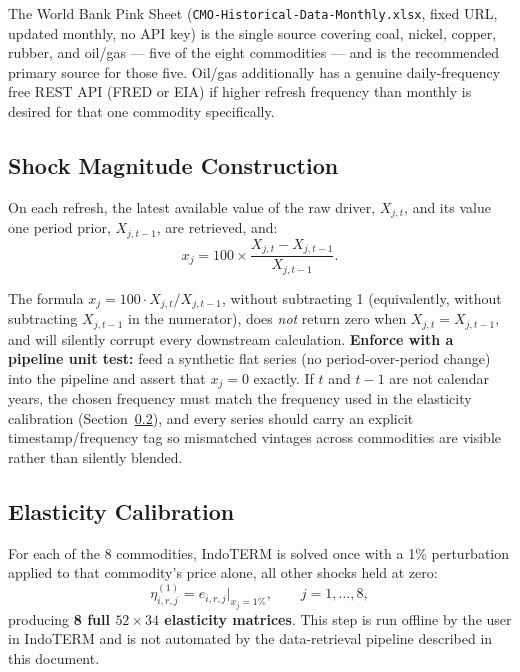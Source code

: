 \documentclass[11pt]{article}
\begin{document}
\noindent The World Bank Pink Sheet (\texttt{CMO-Historical-Data-Monthly.xlsx},
fixed URL, updated monthly, no API key) is the single source covering coal,
nickel, copper, rubber, and oil/gas --- five of the eight commodities --- and
is the recommended primary source for those five. Oil/gas additionally has a
genuine daily-frequency free REST API (FRED or EIA) if higher refresh
frequency than monthly is desired for that one commodity specifically.

\subsection{Shock Magnitude Construction}

On each refresh, the latest available value of the raw driver, $X_{j,t}$,
and its value one period prior, $X_{j,t-1}$, are retrieved, and:
\begin{equation}
  x_j = 100 \times \frac{X_{j,t} - X_{j,t-1}}{X_{j,t-1}}.
  \label{eq:theme1-xj}
\end{equation}

\begin{warningbox}
The formula $x_j = 100 \cdot X_{j,t}/X_{j,t-1}$, without subtracting 1
(equivalently, without subtracting $X_{j,t-1}$ in the numerator), does
\emph{not} return zero when $X_{j,t} = X_{j,t-1}$, and will silently
corrupt every downstream calculation. \textbf{Enforce with a pipeline unit
test:} feed a synthetic flat series (no period-over-period change) into the
pipeline and assert that $x_j = 0$ exactly. If $t$ and $t-1$ are not
calendar years, the chosen frequency must match the frequency used in the
elasticity calibration (Section~\ref{sec:theme1-calibration}), and every
series should carry an explicit timestamp/frequency tag so mismatched
vintages across commodities are visible rather than silently blended.
\end{warningbox}

\subsection{Elasticity Calibration}
\label{sec:theme1-calibration}

For each of the 8 commodities, IndoTERM is solved once with a 1\%
perturbation applied to that commodity's price alone, all other shocks held
at zero:
\begin{equation}
  \eta_{i,r,j}^{(1)} = e_{i,r,j}\Big|_{x_j = 1\%}, \qquad j = 1,\dots,8,
  \label{eq:theme1-eta}
\end{equation}
producing \textbf{8 full $52\times34$ elasticity matrices}. This step is run
offline by the user in IndoTERM and is not automated by the data-retrieval
pipeline described in this document.
\end{document}
